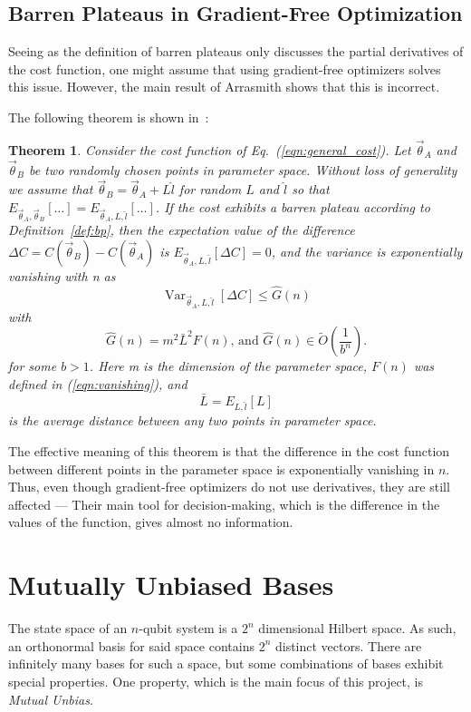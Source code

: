 \documentclass[a4paper,12pt]{article}
\newcommand{\thetas}{\vec{\theta}}
\DeclareMathOperator{\Var}{Var}
\newtheorem{theorem}{Theorem}
\begin{document}
\subsection{Barren Plateaus in Gradient-Free Optimization}
Seeing as the definition of barren plateaus only discusses the partial derivatives of the cost function, one might assume that using gradient-free optimizers solves this issue.
However, the main result of Arrasmith shows that this is incorrect.

The following theorem is shown in~\cite{arrasmith_effect_2021}:

\begin{theorem}
    Consider the cost function of Eq.~(\ref{eqn:general_cost}). Let ${\thetas}_A$ and $\thetas_B$ be two randomly chosen points in parameter space.
    Without loss of generality we assume that $\thetas_B = \thetas_A + L\hat{l}$ for random $L$ and $\hat{l}$ so that $E_{\thetas_A, \thetas_B}[\dots] = E_{\thetas_A, L, \hat{l}}[\dots]$.
    If the cost exhibits a barren plateau according to Definition~\ref{def:bp}, then the expectation value of the difference $\Delta C = C(\thetas_B) - C(\thetas_A)$ is $E_{\thetas_A, L, \hat{l}}[\Delta C] = 0$, and the variance is exponentially vanishing with n as 
    \begin{equation}
        \Var_{\thetas_A,L,\hat{l}}[\Delta C] \leq \hat{G}(n)
    \end{equation}
    with
    \begin{equation}
        \hat{G}(n) = m^2 \bar{L}^2 F(n)\textrm{,    and     } \hat{G}(n) \in \tilde{O}\left(\frac{1}{b^n}\right).
    \end{equation}
    for some $b>1$. Here m is the dimension of the parameter space, $F(n)$ was defined in (\ref{eqn:vanishing}), and
    \begin{equation}
        \bar{L} = E_{L,\hat{l}}[L]
    \end{equation}
    is the average distance between any two points in parameter space.
\end{theorem}

The effective meaning of this theorem is that the difference in the cost function between different points in the parameter space is exponentially vanishing in $n$.
Thus, even though gradient-free optimizers do not use derivatives, they are still affected --- Their main tool for decision-making, which is the difference in the values of the function, gives almost no information.

\section{Mutually Unbiased Bases}
The state space of an $n$-qubit system is a $2^n$ dimensional Hilbert space.
As such, an orthonormal basis for said space contains $2^n$ distinct vectors.
There are infinitely many bases for such a space, but some combinations of bases exhibit special properties. One property, which is the main focus of this project, is \emph{Mutual Unbias}.
\end{document}
